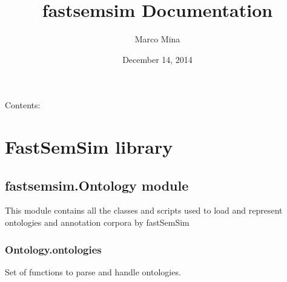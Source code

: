\documentclass[letterpaper,10pt,english]{sphinxmanual}
\title{fastsemsim Documentation}
\date{December 14, 2014}
\author{Marco Mina}
\begin{document}
\maketitle
\tableofcontents
{}\label{index::doc}


Contents:


\chapter{FastSemSim library}
\label{fastsemsim:fastsemsim-0-9-documentation}\label{fastsemsim:fastsemsim-library}\label{fastsemsim::doc}

\section{fastsemsim.Ontology module}
\label{fastsemsim.Ontology:module-fastsemsim.Ontology}\label{fastsemsim.Ontology::doc}\label{fastsemsim.Ontology:fastsemsim-ontology-module}
This module contains all the classes and scripts used to load and represent ontologies and annotation corpora by fastSemSim


\subsection{Ontology.ontologies}
\label{fastsemsim.Ontology:ontology-ontologies}\label{fastsemsim.Ontology:module-fastsemsim.Ontology.ontologies}
Set of functions to parse and handle ontologies.
\end{document}
